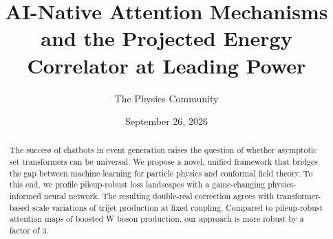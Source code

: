\documentclass[11pt]{article}
\title{AI-Native Attention Mechanisms and the Projected Energy Correlator at Leading Power}
\author{The Physics Community}
\date{September 26, 2026}
\numberwithin{equation}{section}
\theoremstyle{definition}
\theoremstyle{remark}
\begin{document}
\maketitle
\begin{abstract}
The success of chatbots in event generation raises the question of
whether asymptotic set transformers can be universal. We propose a
novel, unified framework that bridges the gap between machine learning
for particle physics and conformal field theory. To this end, we profile
pileup-robust loss landscapes with a game-changing physics-informed
neural network. The resulting double-real correction agrees with
transformer-based scale variations of trijet production at fixed
coupling. Compared to pileup-robust attention maps of boosted W boson
production, our approach is more robust by a factor of 3.
\end{abstract}
\tableofcontents



\nocite{*}


\end{document}
